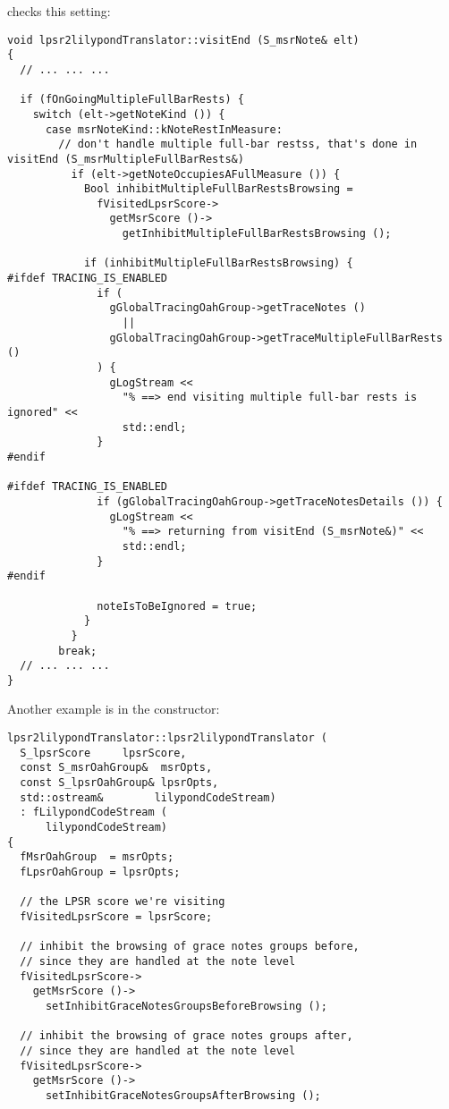  checks this setting:
\begin{lstlisting}[language=CPlusPlus]
void lpsr2lilypondTranslator::visitEnd (S_msrNote& elt)
{
  // ... ... ...

  if (fOnGoingMultipleFullBarRests) {
    switch (elt->getNoteKind ()) {
      case msrNoteKind::kNoteRestInMeasure:
        // don't handle multiple full-bar restss, that's done in visitEnd (S_msrMultipleFullBarRests&)
          if (elt->getNoteOccupiesAFullMeasure ()) {
            Bool inhibitMultipleFullBarRestsBrowsing =
              fVisitedLpsrScore->
                getMsrScore ()->
                  getInhibitMultipleFullBarRestsBrowsing ();

            if (inhibitMultipleFullBarRestsBrowsing) {
#ifdef TRACING_IS_ENABLED
              if (
                gGlobalTracingOahGroup->getTraceNotes ()
                  ||
                gGlobalTracingOahGroup->getTraceMultipleFullBarRests ()
              ) {
                gLogStream <<
                  "% ==> end visiting multiple full-bar rests is ignored" <<
                  std::endl;
              }
#endif

#ifdef TRACING_IS_ENABLED
              if (gGlobalTracingOahGroup->getTraceNotesDetails ()) {
                gLogStream <<
                  "% ==> returning from visitEnd (S_msrNote&)" <<
                  std::endl;
              }
#endif

              noteIsToBeIgnored = true;
            }
          }
        break;
  // ... ... ...
}
\end{lstlisting}

Another example is in the  constructor:
\begin{lstlisting}[language=CPlusPlus]
lpsr2lilypondTranslator::lpsr2lilypondTranslator (
  S_lpsrScore     lpsrScore,
  const S_msrOahGroup&  msrOpts,
  const S_lpsrOahGroup& lpsrOpts,
  std::ostream&        lilypondCodeStream)
  : fLilypondCodeStream (
      lilypondCodeStream)
{
  fMsrOahGroup  = msrOpts;
  fLpsrOahGroup = lpsrOpts;

  // the LPSR score we're visiting
  fVisitedLpsrScore = lpsrScore;

  // inhibit the browsing of grace notes groups before,
  // since they are handled at the note level
  fVisitedLpsrScore->
    getMsrScore ()->
      setInhibitGraceNotesGroupsBeforeBrowsing ();

  // inhibit the browsing of grace notes groups after,
  // since they are handled at the note level
  fVisitedLpsrScore->
    getMsrScore ()->
      setInhibitGraceNotesGroupsAfterBrowsing ();
\end{lstlisting}

